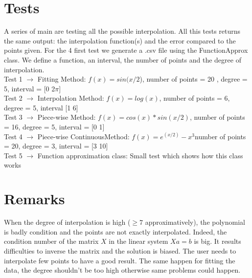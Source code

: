 \documentclass[12pt]{article}
\begin{document}
\section{Tests}
A series of main are testing all the possible interpolation. All this tests returns the same output: the interpolation function(s) and the error compared to the points given. For the 4 first test we generate a .csv file using the FunctionApprox class. We define a function, an interval, the number of points and the degree of interpolation.\\
Test 1 $\rightarrow$ Fitting Method: $f(x) = sin(x/2$), number of points =  20 , degree = 5, interval = [0 2$\pi$] \\
Test 2 $\rightarrow$ Interpolation Method: $f(x) = log(x)$, number of points = 6, degree = 5, interval [1 6] \\
Test 3 $\rightarrow$ Piece-wise Method: $f(x) = cos(x)*sin(x/2)$, number of points = 16, degree = 5, interval = [0 1] \\
Test 4 $\rightarrow$ Piece-wise ContinuousMethod: $f(x) = e^{(x/2)} -x^3$number of points = 20, degree = 3, interval = [3 10] \\
Test 5 $\rightarrow$ Function approximation class: Small test which shows how this class works\\


\section{Remarks}
When the degree of interpolation is high ($\ge 7$ approximatively), the polynomial is badly condition and the points are not exactly interpolated. Indeed, the condition number of the matrix $X$ in the linear system $Xa=b$ is big. It results difficulties to inverse the matrix and the solution is biased. The user needs to interpolate few points to have a good result.
The same happen for fitting the data, the degree shouldn't be too high otherwise same problems could happen.

 
\end{document}
